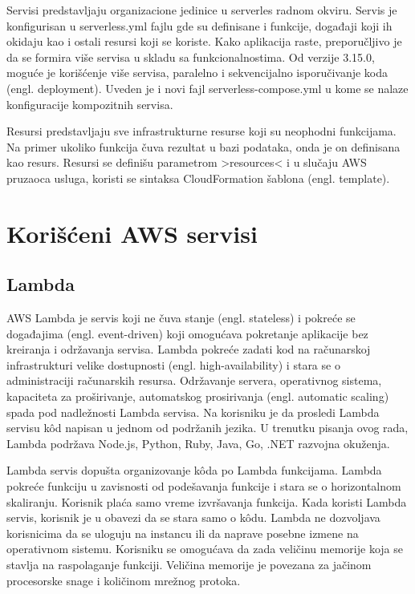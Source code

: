 \documentclass[12pt,oneside]{memoir}
\begin{document}
Servisi predstavljaju organizacione jedinice u serverles radnom okviru. Servis je konfigurisan u serverless.yml fajlu gde su definisane i funkcije, događaji koji ih okidaju kao i ostali resursi koji se koriste. Kako aplikacija raste, preporučljivo je da se formira više servisa u skladu sa funkcionalnostima\cite{sfs}. Od verzije 3.15.0, moguće je korišćenje više servisa, paralelno i sekvencijalno isporučivanje koda (engl. deployment). Uveden je i novi fajl serverless-compose.yml u kome se nalaze konfiguracije kompozitnih servisa.
 
Resursi predstavljaju sve infrastrukturne resurse koji su neophodni funkcijama. Na primer ukoliko funkcija čuva rezultat u bazi podataka, onda je on definisana kao resurs. Resursi se definišu parametrom >resources< i u slučaju AWS pruzaoca usluga, koristi se sintaksa CloudFormation šablona (engl. template).

\section{Korišćeni AWS servisi}
\subsection{Lambda}
 
AWS Lambda je servis koji ne čuva stanje (engl. stateless) i pokreće se događajima (engl. event-driven) koji omogućava pokretanje aplikacije bez kreiranja i održavanja servisa. Lambda pokreće zadati kod na računarskoj infrastrukturi velike dostupnosti (engl. high-availability) i stara se o administraciji računarskih resursa. Održavanje servera, operativnog sistema, kapaciteta za proširivanje, automatskog prosirivanja (engl. automatic scaling) spada pod nadležnosti Lambda servisa. Na korisniku je da prosledi Lambda servisu kôd napisan u jednom od podržanih jezika. U trenutku pisanja ovog rada, Lambda podržava Node.js, Python, Ruby, Java, Go, .NET razvojna okuženja\cite{lr}.
 
Lambda servis dopušta organizovanje kôda po Lambda funkcijama. Lambda pokreće funkciju u zavisnosti od podešavanja funkcije i stara se o horizontalnom skaliranju. Korisnik plaća samo vreme izvršavanja funkcija. Kada koristi Lambda servis, korisnik je u obavezi da se stara samo o kôdu. Lambda ne dozvoljava korisnicima da se uloguju na instancu ili da naprave posebne izmene na operativnom sistemu. Korisniku se omogućava da zada veličinu memorije koja se stavlja na raspolaganje funkciji. Veličina memorije je povezana za jačinom procesorske snage i količinom mrežnog protoka.
 
\end{document}
